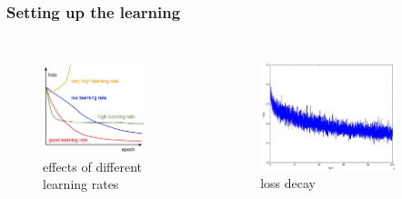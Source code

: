 \begin{frame}
	\frametitle{Setting up the learning}

	\begin{columns}
                \begin{figure}
                        \includegraphics[width=0.8\textwidth]{Pics/learningrates}\\
                        \small{effects of different learning rates}
                \end{figure}
                \begin{figure}
                        \includegraphics[width=0.8\textwidth]{Pics/loss}\\
                        \small{loss decay}
                \end{figure}

        \end{columns}

\end{frame}

